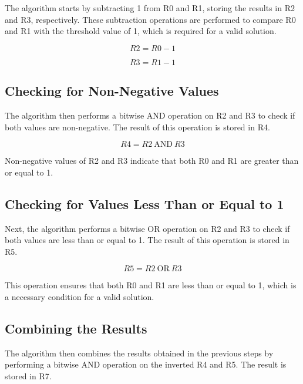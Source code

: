 The algorithm starts by subtracting 1 from R0 and R1, storing the results in R2 and R3, respectively. These subtraction operations are performed to compare R0 and R1 with the threshold value of 1, which is required for a valid solution.

\begin{equation}
R2 = R0 - 1
\end{equation}

\begin{equation}
R3 = R1 - 1
\end{equation}

\subsection{Checking for Non-Negative Values}

The algorithm then performs a bitwise AND operation on R2 and R3 to check if both values are non-negative. The result of this operation is stored in R4.

\begin{equation}
R4 = R2 \: \mathrm{AND} \: R3
\end{equation}

Non-negative values of R2 and R3 indicate that both R0 and R1 are greater than or equal to 1.

\subsection{Checking for Values Less Than or Equal to 1}

Next, the algorithm performs a bitwise OR operation on R2 and R3 to check if both values are less than or equal to 1. The result of this operation is stored in R5.

\begin{equation}
R5 = R2 \: \mathrm{OR} \: R3
\end{equation}

This operation ensures that both R0 and R1 are less than or equal to 1, which is a necessary condition for a valid solution.

\subsection{Combining the Results}

The algorithm then combines the results obtained in the previous steps by performing a bitwise AND operation on the inverted R4 and R5. The result is stored in R7.

